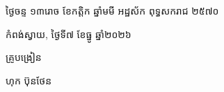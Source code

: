 \documentclass[a4paper,10pt]{article}
\begin{document}
\vspace{6pt}
{\centering
\hspace*{5.2cm}\begin{minipage}{11.5cm}
  \centering
  ថ្ងៃចន្ទ ១៣រោច ខែកត្តិក ឆ្នាំមមី អដ្ឋស័ក ពុទ្ធសករាជ ២៥៧០\par
  កំពង់ស្វាយ, ថ្ងៃទី៧ ខែធ្នូ ឆ្នាំ២០២៦\par
  \vspace{2pt}
  {\muol គ្រូបង្រៀន\par}
  \vspace{32pt}
  \hfill{\muol ហុក ប៊ុនថែន}\hspace*{1.4cm}
\end{minipage}\par}
\end{document}
